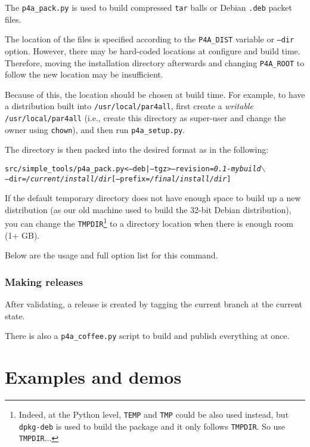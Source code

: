\documentclass[a4paper]{article}
\begin{document}
The \verb|p4a_pack.py| is used to build compressed \texttt{tar} balls or Debian
\texttt{.deb} packet files.

The location of the \Apfa files is specified according
to the \verb|P4A_DIST| variable or \texttt{--dir} option. However, there may be
hard-coded locations at configure and build time. Therefore, moving the
installation directory afterwards and changing \verb|P4A_ROOT| to follow
the new location may be insufficient.

Because of this, the location should be chosen at build time. For
example, to have a distribution built
into \texttt{/usr/local/par4all},
first create a \emph{writable} \texttt{/usr/local/par4all} (i.e.,
create this directory as super-user and change the owner using
\texttt{chown}), and then run \verb|p4a_setup.py|.

The directory is then packed into the desired format as in the
following:
\begin{alltt}
src/simple_tools/p4a_pack.py <--deb|--tgz> --revision=\emph{0.1-mybuild} \(\backslash\)
  --dir=\emph{/current/install/dir} [--prefix=\emph{/final/install/dir}]
\end{alltt}

If the default temporary directory does not have enough space to build up a new
distribution (as our old machine used to build the 32-bit Debian
distribution), you can change the \texttt{TMPDIR}\footnote{Indeed, at the
  Python level, \texttt{TEMP} and \texttt{TMP} could be also used instead,
  but \texttt{dpkg-deb} is used to build the package and it only follows
  \texttt{TMPDIR}. So use \texttt{TMPDIR}...} to a directory location when
there is enough room (1+ GB).

Below are the usage and full option list for this command.





\subsubsection{Making releases}
\label{sec:releases}

After validating, a release is created by tagging the current branch
at the current state.

There is also a \verb|p4a_coffee.py| script to build and publish everything
at once.




\section{Examples and demos}
\label{sec:examples-demos}
\end{document}

